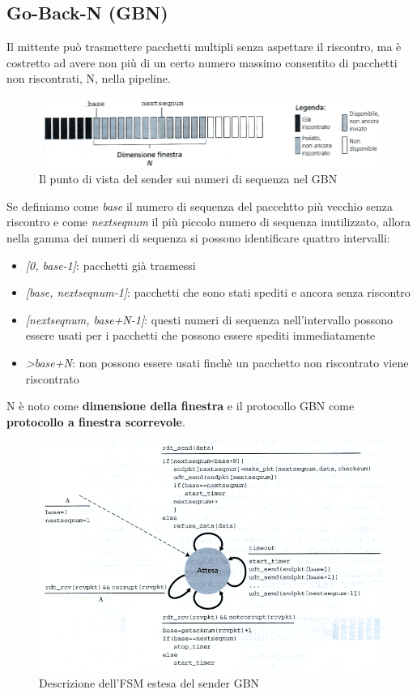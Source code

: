 \documentclass[11pt,a4paper]{book}
\begin{document}
\subsection{Go-Back-N (GBN)}
Il mittente può trasmettere pacchetti multipli senza aspettare il riscontro, ma è costretto ad avere non più di un certo numero massimo consentito di pacchetti non riscontrati, N, nella pipeline.
\begin{figure}
	\includegraphics[scale=0.6]{img/025.png}
	\caption{Il punto di vista del sender sui numeri di sequenza nel GBN}
\end{figure}
Se definiamo come \emph{base} il numero di sequenza del paccehtto più vecchio senza riscontro e come \emph{nextseqnum} il più piccolo numero di sequenza inutilizzato, allora nella gamma dei numeri di sequenza si possono identificare quattro intervalli:
\begin{itemize}
	\item \emph{[0, base-1]}: pacchetti già trasmessi
	\item \emph{[base, nextseqnum-1]}: pacchetti che sono stati spediti e ancora senza riscontro
	\item \emph{[nextseqnum, base+N-1]}: questi numeri di sequenza nell'intervallo possono essere usati per i pacchetti che possono essere spediti immediatamente
	\item \emph{>base+N}: non possono essere usati finchè un pacchetto non riscontrato viene riscontrato
\end{itemize}
N è noto come \textbf{dimensione della finestra} e il protocollo GBN come \textbf{protocollo a finestra scorrevole}.
\begin{figure}
	\includegraphics[scale=0.6]{img/026.png}
	\caption{Descrizione dell'FSM estesa del sender GBN}
\end{figure}
\end{document}
